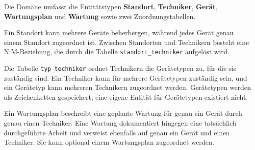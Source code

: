 \documentclass[11pt,a4paper]{article}
\begin{document}
Die Domäne umfasst die Entitätstypen \textbf{Standort},
\textbf{Techniker}, \textbf{Gerät}, \textbf{Wartungsplan}
und \textbf{Wartung} sowie zwei Zuordnungstabellen.

Ein Standort kann mehrere Geräte beherbergen, während jedes Gerät
genau einem Standort zugeordnet ist. Zwischen Standorten und
Technikern besteht eine N:M-Beziehung, die durch die Tabelle
\texttt{standort\_techniker} aufgelöst wird.

Die Tabelle \texttt{typ\_techniker} ordnet Technikern die Gerätetypen
zu, für die sie zuständig sind. Ein Techniker kann für mehrere
Gerätetypen zuständig sein, und ein Gerätetyp kann mehreren
Technikern zugeordnet werden. Gerätetypen werden als Zeichenketten
gespeichert; eine eigene Entität für Gerätetypen existiert nicht.

Ein Wartungsplan beschreibt eine geplante Wartung für genau ein
Gerät durch genau einen Techniker. Eine Wartung dokumentiert
hingegen eine tatsächlich durchgeführte Arbeit und verweist
ebenfalls auf genau ein Gerät und einen Techniker.
Sie kann optional einem Wartungsplan zugeordnet werden.
\end{document}
